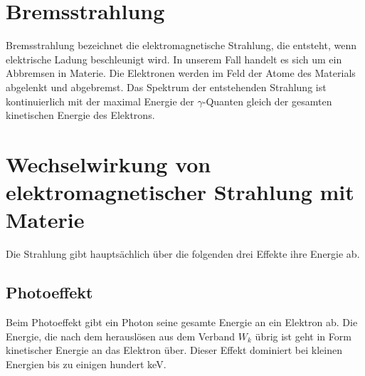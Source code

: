 \documentclass[twoside,colorback,accentcolor=tud4c,11pt]{tudreport}
\begin{document}
\section{Bremsstrahlung}
Bremsstrahlung bezeichnet die elektromagnetische Strahlung, die entsteht, wenn elektrische Ladung beschleunigt wird. In unserem Fall handelt es sich um ein Abbremsen in Materie. Die Elektronen werden im Feld der Atome des Materials abgelenkt und abgebremst. Das Spektrum der entstehenden Strahlung ist kontinuierlich mit der maximal Energie der $ \gamma $-Quanten gleich der gesamten kinetischen Energie des Elektrons.
\section{Wechselwirkung von elektromagnetischer Strahlung mit Materie}
Die Strahlung gibt hauptsächlich über die folgenden drei Effekte ihre Energie ab.
\subsection{Photoeffekt}
Beim Photoeffekt gibt ein Photon seine gesamte Energie an ein Elektron ab. Die Energie, die nach dem herauslösen aus dem Verband $ W_k $ übrig ist geht in Form kinetischer Energie an das Elektron über. Dieser Effekt dominiert bei kleinen Energien bis zu einigen hundert keV.
\end{document}
